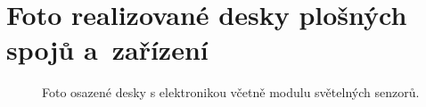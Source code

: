 \chapter{Foto realizované desky plošných spojů a~zařízení}
\begin{figure}[h]
	\centering
	\quad
	\caption{Foto osazené desky s elektronikou včetně modulu světelných senzorů.}
	\label{fig_finalPCB}
\end{figure}


